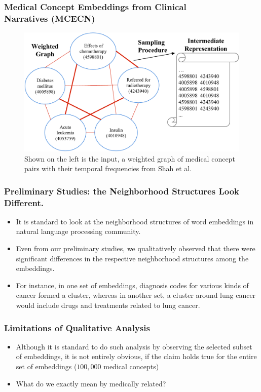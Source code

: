 \documentclass{beamer}
\begin{document}
\begin{frame}
\frametitle{Medical Concept Embeddings from
Clinical \\ Narratives (MCECN)}
\begin{figure}[t]
    \centering 
    \includegraphics[width=0.8\linewidth]{figs/Figure1-transform.pdf}
    \caption{ \scriptsize
Shown on the left is the input, a weighted graph
of medical concept pairs with their
temporal frequencies from Shah et al.}  
\end{figure}
\end{frame}

\begin{frame}
\frametitle{Preliminary Studies: the Neighborhood
Structures Look Different.}
\begin{itemize}
\item It is standard to look at the neighborhood
structures of word embeddings in natural language
processing community.

\bigskip

\item Even from our preliminary studies,
we qualitatively observed that there were significant differences in the respective neighborhood structures
among the embeddings.

\bigskip

\item For instance, in one set of embeddings, diagnosis
codes for various kinds of cancer formed a cluster, whereas in another set, a cluster
around lung cancer would include drugs and treatments related to lung cancer.

\end{itemize}
\end{frame}

\begin{frame}
\frametitle{Limitations of Qualitative Analysis}
\begin{itemize}
\item Although it is standard to do such analysis
by observing the selected subset of embeddings,
it is not entirely obvious, if the claim holds
true for the entire set of embeddings ($100,000$ 
medical concepts) 

\bigskip

\item What do we exactly mean by medically
related? 

\end{itemize}
\end{frame}
\end{document}
